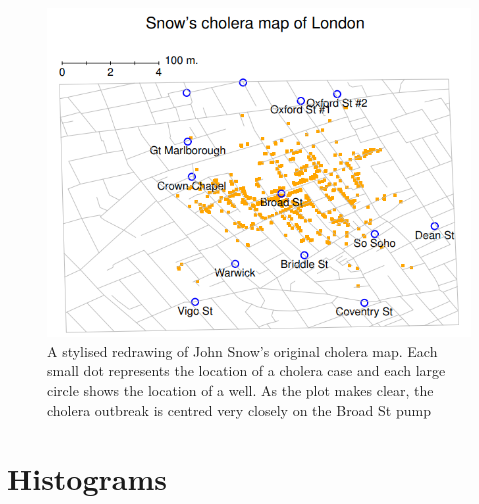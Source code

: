 \documentclass[
]{book}
\begin{document}
\begin{figure}
\includegraphics[width=0.9\linewidth]{images/Figure22} \caption{A stylised redrawing of John Snow’s original cholera map. Each small dot represents the location of a cholera case and each large circle shows the location of a well. As the plot makes clear, the cholera outbreak is centred very closely on the Broad St pump}\label{fig:fig5-1}
\end{figure}

\hypertarget{histograms}{%
\section{Histograms}\label{histograms}}
\end{document}
